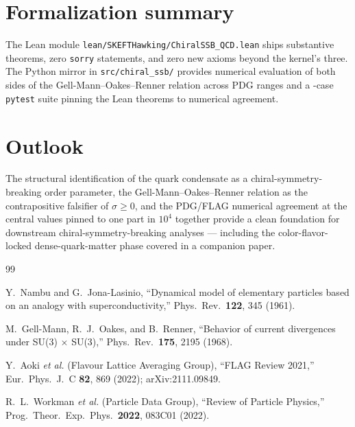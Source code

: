 \documentclass[twocolumn]{revtex4-2}
\begin{document}
\section{Formalization summary}
\label{sec:formalization}

The Lean module \texttt{lean/SKEFTHawking/ChiralSSB\_QCD.lean} ships
\chiralSsbThms{} substantive theorems, zero \texttt{sorry} statements, and zero
new axioms beyond the kernel's three. The Python mirror in
\texttt{src/chiral\_ssb/} provides numerical evaluation of both sides
of the Gell-Mann--Oakes--Renner relation across PDG ranges and a
\chiralSsbTests{}-case \texttt{pytest} suite pinning the Lean theorems to numerical
agreement.

\section{Outlook}
\label{sec:outlook}

The structural identification of the quark condensate as a
chiral-symmetry-breaking order parameter, the
Gell-Mann--Oakes--Renner relation as the contrapositive falsifier
of $\sigma \ge 0$, and the PDG/FLAG numerical agreement at the central
values pinned to one part in $10^4$ together provide a clean
foundation for downstream chiral-symmetry-breaking analyses ---
including the color-flavor-locked dense-quark-matter phase covered in
a companion paper.

\begin{thebibliography}{99}

Y.~Nambu and G.~Jona-Lasinio,
``Dynamical model of elementary particles based on an analogy with
superconductivity,''
Phys.\ Rev.\ \textbf{122}, 345 (1961).

M.~Gell-Mann, R.~J.~Oakes, and B.~Renner,
``Behavior of current divergences under SU(3) $\times$ SU(3),''
Phys.\ Rev.\ \textbf{175}, 2195 (1968).

Y.~Aoki \emph{et al.\/} (Flavour Lattice Averaging Group),
``FLAG Review 2021,''
Eur.\ Phys.\ J.\ C \textbf{82}, 869 (2022); arXiv:2111.09849.

R.~L.~Workman \emph{et al.\/} (Particle Data Group),
``Review of Particle Physics,''
Prog.\ Theor.\ Exp.\ Phys.\ \textbf{2022}, 083C01 (2022).

\end{thebibliography}
\end{document}
